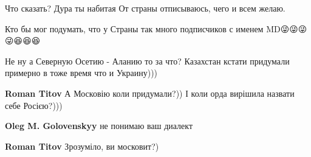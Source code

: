 \begin{itemize}
 
Что сказать?
Дура ты набитая
От страны отписываюсь, чего и всем желаю.

 
Кто бы мог подумать, что у Страны так много подписчиков с именем MD😜😜😜😜😆😆😆

 
Не ну а Северную Осетию - Аланию то за что? Казахстан кстати придумали примерно в тоже время что и Украину)))

\begin{itemize}
 
\textbf{Roman Titov} А Московію коли придумали?)) І коли орда вирішила назвати себе Росією?)))

 
\textbf{Oleg M. Golovenskyy} не понимаю ваш диалект

 
\textbf{Roman Titov} Зрозуміло, ви московит?)

 

\end{itemize}
\end{itemize}
